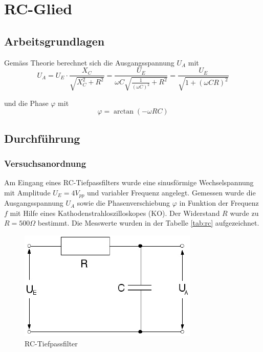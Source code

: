 \section{RC-Glied}

\subsection{Arbeitsgrundlagen}

Gem\"ass Theorie berechnet sich die Ausgangsspannung $U_A$ mit
\begin{equation}
    U_A = U_E \cdot \frac{X_C}{\sqrt{X_C^2+R^2}} = \frac{U_E}{\omega C \sqrt{\frac{1}{(\omega C)^2} + R^2}} = \frac{U_E}{\sqrt{1 + (\omega C R)^2}}
    \label{eq:ua}
\end{equation}

und die Phase $\varphi$ mit
\begin{equation}
    \varphi = \arctan(-\omega R C)
    \label{eq:phase}
\end{equation}


\subsection{Durchf\"{u}hrung}

\subsubsection*{Versuchsanordnung}

Am Eingang eines RC-Tiefpassfilters wurde eine sinusf\"ormige Wechselspannung mit Amplitude
$U_E = 4 V_{pp}$ und variabler Frequenz angelegt. Gemessen wurde die Ausgangsspannung $U_A$
sowie die Phasenverschiebung $\varphi$ in Funktion der Frequenz $f$ mit Hilfe eines
Kathodenstrahloszilloskopes (KO). Der Widerstand $R$ wurde zu $R=500\Omega$ bestimmt.
Die Messwerte wurden in der Tabelle \ref{tab:rc} aufgezeichnet.

\begin{figure}[H]
    \center
    \includegraphics[width=.5\textwidth]{images/rc-lowpass}
    \caption{RC-Tiefpassfilter}
    \label{fig:rc}
\end{figure}


